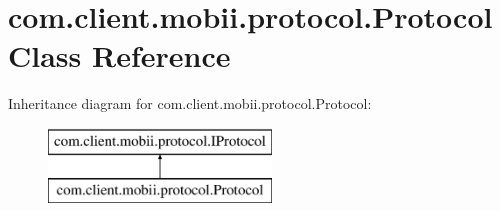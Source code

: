 \hypertarget{classcom_1_1client_1_1mobii_1_1protocol_1_1_protocol}{\section{com.\-client.\-mobii.\-protocol.\-Protocol Class Reference}
\label{classcom_1_1client_1_1mobii_1_1protocol_1_1_protocol}
}
Inheritance diagram for com.\-client.\-mobii.\-protocol.\-Protocol\-:\begin{figure}[H]
\begin{center}
\leavevmode
\includegraphics[height=2.000000cm]{classcom_1_1client_1_1mobii_1_1protocol_1_1_protocol}
\end{center}
\end{figure}

